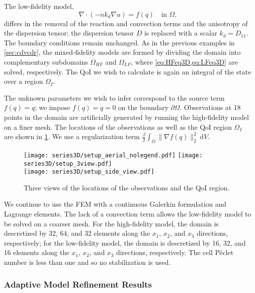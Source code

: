 The low-fidelity model,
%
\begin{equation}
\nabla\cdot(- nk_d\nabla u) = f(q) \quad \text{in } \Omega, \label{eq:LFeq3D}
\end{equation}
%
differs in the removal of the reaction and convection terms and the anisotropy of the dispersion tensor; the dispersion tensor $D$ is replaced with a scalar $k_d=D_{11}$. The boundary conditions remain unchanged. As in the previous examples in \cref{sec:cdvcdr}, the mixed-fidelity models are formed by dividing the domain into complementary subdomains $\Omega_{HF}$ and $\Omega_{LF}$, where \cref{eq:HFeq3D,eq:LFeq3D} are solved, respectively. The QoI we wish to calculate is again an integral of the state over a region $\Omega_I$. 

The unknown parameters we wish to infer correspond to the source term $f(q)=q$; we impose $f(q)=q=0$ on the boundary $\partial\Omega$. Observations at 18 points in the domain are artificially generated by running the high-fidelity model on a finer mesh. The locations of the observations as well as the QoI region $\Omega_I$ are shown in \cref{fig:setup3D}. We use a regularization term $\frac{\beta}{2}\int_\Omega \|\nabla f(q)\|_2^2\:\textrm{d}V$.
%
\begin{figure}[htbp]
\centering
\texttt{[image: series3D/setup\_aerial\_nolegend.pdf]} \hfill
\texttt{[image: series3D/setup\_3view.pdf]} \\ 
\vspace{\baselineskip}
\texttt{[image: series3D/setup\_side\_view.pdf]}
\caption{Three views of the locations of the observations and the QoI region.}
\label{fig:setup3D}
\end{figure}
%

We continue to use the FEM with a continuous Galerkin formulation and Lagrange elements. The lack of a convection term allows the low-fidelity model to be solved on a coarser mesh. For the high-fidelity model, the domain is descretized by 32, 64, and 32 elements along the $x_1$, $x_2$, and $x_3$ directions, respectively; for the low-fidelity model, the domain is descretized by 16, 32, and 16 elements along the $x_1$, $x_2$, and $x_3$ directions, respectively. The cell P\'{e}clet number is less than one and so no stabilization is used.

\subsubsection{Adaptive Model Refinement Results} \label{sec:ref3D_diffmesh}

